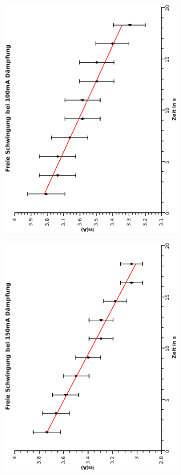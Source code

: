 \documentclass{article}
\begin{document}
\begin{figure}
\begin{subfigure}{0.5\textwidth}
\includegraphics[width=0.9\linewidth,angle=-90]{frei100.eps}
\end{subfigure}
\begin{subfigure}{0.5\textwidth}
\includegraphics[width=0.9\linewidth, angle=-90]{frei150.eps}
\end{subfigure}
\end{figure}
\end{document}
